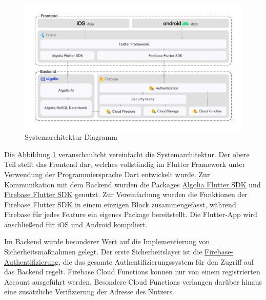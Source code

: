 
\begin{figure}[H]
    \centering
    \includegraphics[width=1\textwidth]{pics/systemarchitektur_diagram.png}
    \caption{Systemarchitektur Diagramm}
    \label{fig:systemarchitektur}
\end{figure}

% 
Die Abbildung \ref{fig:systemarchitektur}
veranschaulicht vereinfacht die Systemarchitektur. Der
obere Teil stellt das Frontend dar, welches vollständig im
Flutter Framework unter Verwendung der Programmiersprache
Dart entwickelt wurde. Zur Kommunikation mit dem Backend
wurden die Packages \href{https://pub.dev/packages/algolia}{Algolia
    Flutter SDK} und
\href{https://pub.dev/packages/firebase}{Firebase Flutter
    SDK} genutzt. Zur Vereinfachung wurden die Funktionen der
Firebase Flutter SDK in einem einzigen Block
zusammengefasst, während Firebase für jedes Feature ein
eigenes Package bereitstellt. Die Flutter-App wird
anschließend für iOS und Android kompiliert.

Im Backend wurde besonderer Wert auf die Implementierung von
Sicherheitsmaßnahmen gelegt. Der erste Sicherheitslayer ist
die
\href{https://firebase.google.com/docs/auth}{Firebase-Authentifizierung},
die das gesamte Authentifizierungssystem für den Zugriff auf
das Backend regelt. Firebase Cloud Functions können nur von
einem registrierten Account ausgeführt werden. Besondere
Cloud Functions verlangen darüber hinaus eine zusätzliche
Verifizierung der Adresse des Nutzers.

